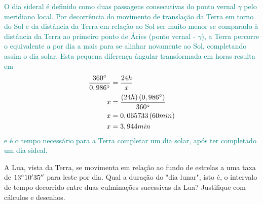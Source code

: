 \begin{sol}
	\textcolor{teal} { 
		O dia sideral é definido como duas passagens consecutivas do ponto vernal $\gamma$ pelo meridiano local. Por decorrência do movimento de translação da Terra em torno do Sol e da distância da Terra em relação ao Sol ser muito menor se comparado à distância da Terra ao primeiro ponto de Áries (ponto vernal - $\gamma$), a Terra percorre o equivalente a  por dia a mais para se alinhar novamente ao Sol, completando assim o dia solar. Esta pequena diferença ângular transformada em horas resulta em
		\begin{align}
			\frac{360^{\circ}}{0,986^{\circ}}&=\frac{24h}{x}\nonumber \\
			x&=\frac{\left(24h\right)\left(0,986^{\circ}\right)}{360^{\circ}}\nonumber \\
			x&=0,065733\left(60min\right)\nonumber \\
			x&=3,944min
		\end{align}
		e é o tempo necessário para a Terra completar um dia solar, após ter completado um dia sideal.
	}
\end{sol}
\begin{prob}[ref: P19]
	A Lua, vista da Terra, se movimenta em relação ao fundo de estrelas a uma taxa de $13^{\circ}10^{\prime}35^{\prime \prime}$ para leste por dia. Qual a duração do "dia lunar", isto é, o intervalo de tempo decorrido entre duas culminações sucessivas da Lua? Justifique com cálculos e desenhos.
\end{prob}

